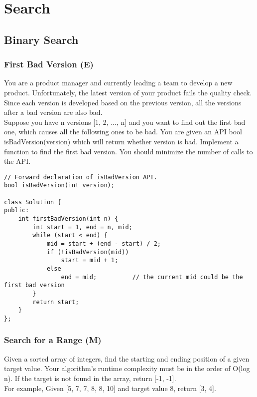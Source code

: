 \chapter{Search}

\section{Binary Search}
\subsection{First Bad Version (E)}
You are a product manager and currently leading a team to develop a new product. Unfortunately, the latest version of your product fails the quality check. Since each version is developed based on the previous version, all the versions after a bad version are also bad.\\

Suppose you have n versions [1, 2, ..., n] and you want to find out the first bad one, which causes all the following ones to be bad. You are given an API bool isBadVersion(version) which will return whether version is bad. Implement a function to find the first bad version. You should minimize the number of calls to the API. \\

\begin{lstlisting}
// Forward declaration of isBadVersion API.
bool isBadVersion(int version);

class Solution {
public:
    int firstBadVersion(int n) {
        int start = 1, end = n, mid;
        while (start < end) {
            mid = start + (end - start) / 2;
            if (!isBadVersion(mid))
                start = mid + 1;
            else
                end = mid;          // the current mid could be the first bad version
        }
        return start;
    }
};
\end{lstlisting}


\subsection{Search for a Range (M)}
Given a sorted array of integers, find the starting and ending position of a given target value. Your algorithm's runtime complexity must be in the order of O(log n). If the target is not found in the array, return [-1, -1].\\

For example,
Given [5, 7, 7, 8, 8, 10] and target value 8,
return [3, 4]. \\

